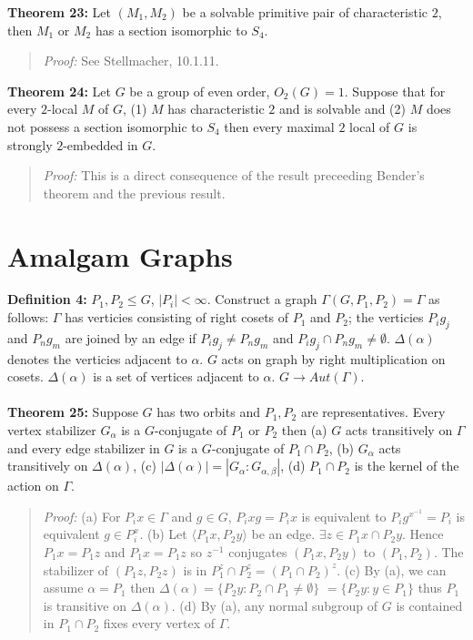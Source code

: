 {\bf Theorem 23:}
Let $(M_1, M_2)$ be a solvable primitive pair of characteristic $2$, then $M_1$ or
$M_2$ has a section isomorphic to $S_4$.
\begin{quote}
\emph{Proof:}  See Stellmacher, 10.1.11.
\end{quote}
{\bf Theorem 24:}
Let $G$ be a group of even order, $O_2(G)=1$.  Suppose that for every $2$-local $M$ of $G$,
(1) $M$ has characteristic $2$ and is solvable and (2) $M$ does not possess a section
isomorphic to $S_4$ then every maximal $2$ local of $G$ is strongly $2$-embedded in $G$.
\begin{quote}
\emph{Proof:}  This is a direct consequence of the result preceeding Bender's theorem and the previous result.
\end{quote}
\section {Amalgam Graphs}
{\bf Definition 4:}
$P_1, P_2 \le G$, $|P_i|< \infty$.  Construct a graph $\Gamma(G, P_1, P_2)=\Gamma$
as follows: $\Gamma$ has verticies consisting of right cosets of $P_1$ and $P_2$; the verticies
$P_i g_j$ and $P_n g_m$ are
joined by an edge if $P_i g_j \ne P_n g_m$ and
$P_i g_j \cap P_n g_m \ne \emptyset$.  $\Delta(\alpha)$ denotes the verticies
adjacent to $\alpha$.  $G$ acts on graph by right multiplication on cosets.  $\Delta(\alpha)$ is a set of vertices adjacent to $\alpha$.
$G \rightarrow Aut(\Gamma)$.
\\
\\
{\bf Theorem 25:}
Suppose $G$ has two orbits and $P_1, P_2$ are representatives.  Every vertex stabilizer
$G_{\alpha}$ is a $G$-conjugate of $P_1$ or $P_2$ then
(a) $G$ acts transitively on $\Gamma$ and every edge stabilizer in
$G$ is a $G$-conjugate of $P_1 \cap P_2$, (b) $G_{\alpha}$ acts transitively
on $\Delta(\alpha)$, (c) $|\Delta(\alpha)|= |G_{\alpha}:G_{\alpha, \beta}|$,
(d) $P_1 \cap P_2$ is the kernel of the action on $\Gamma$.
\begin{quote}
\emph{Proof:}  (a) For $P_ix \in \Gamma$ and $g \in G$, $P_ixg=P_ix$ is equivalent to
$P_i g^{x^{-1}} = P_i$ is equivalent $g \in P_i^x$.
(b) Let $\langle P_1x, P_2y \rangle$ be an edge.  $\exists z \in P_1x \cap P_2y$.  Hence
$P_1x = P_1z$ and $P_1x = P_1z$ so $z^{-1}$ conjugates $(P_1x, P_2y)$ to $(P_1, P_2)$.  The
stabilizer of $(P_1z, P_2z)$ is in $P_1^z \cap P_2^z= (P_1 \cap P_2)^z$.
(c) By (a), we can assume $\alpha= P_1$ then $\Delta( \alpha ) = \{ P_2y : P_2 \cap P_1 \neq \emptyset \}$
$= \{ P_2y : y \in P_1 \}$ thus $P_1$ is transitive on $\Delta( \alpha )$.
(d) By (a), any normal subgroup of $G$ is contained in $P_1 \cap P_2$ fixes every vertex of $\Gamma$.
\end{quote}

